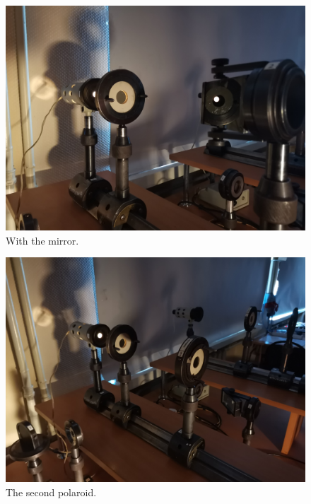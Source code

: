 \begin{minipage}{0.45\textwidth}
    \begin{figure}[h]
    \centering
    \includegraphics[width=1.1\textwidth]{images/mirror-pol.jpg}
    \caption{With the mirror.}
	\end{figure}
\end{minipage}
\hfill
\begin{minipage}{0.45\textwidth}
    \begin{figure}[h]
    \centering
    \includegraphics[width=1.1\textwidth]{images/2pol.jpg}
    \caption{The second polaroid.}
	\end{figure}
\end{minipage}
